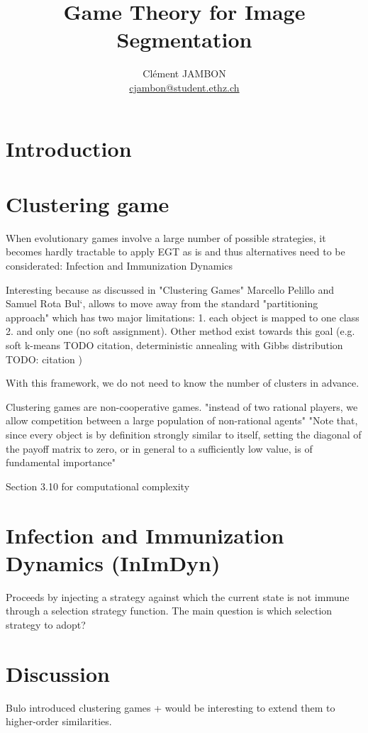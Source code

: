 \documentclass[11pt,a4paper]{article}
\begin{document}
\title{Game Theory for Image Segmentation}
\author{Clément JAMBON \\ \href{mailto:cjambon@student.ethz.ch}{cjambon@student.ethz.ch}}
\maketitle

\begin{abstract}
    
\end{abstract}

\section{Introduction}

\section{Clustering game}

When evolutionary games involve a large number of possible strategies, it becomes hardly tractable to apply EGT as is and thus alternatives need to be considerated: Infection and Immunization Dynamics    

Interesting because as discussed in "Clustering Games" Marcello Pelillo and Samuel Rota Bul`, allows to move away from the standard "partitioning approach" which has two major limitations: 1. each object is mapped to one class 2. and only one (no soft assignment). Other method exist towards this goal (e.g. soft k-means TODO citation, deterministic annealing with Gibbs distribution TODO: citation )

With this framework, we do not need to know the number of clusters in advance.

Clustering games are non-cooperative games. "instead of two rational players, we allow competition between a large population of non-rational agents" "Note that, since every object is by definition strongly similar to itself, setting the diagonal of the payoff matrix to zero, or in general to a sufficiently low value, is of fundamental importance"

Section 3.10 for computational complexity

\section{Infection and Immunization Dynamics (InImDyn)}
Proceeds by injecting a strategy against which the current state is not immune through a selection strategy function. The main question is which selection strategy to adopt?

\section{Discussion}

Bulo introduced clustering games + would be interesting to extend them to higher-order similarities.
\end{document}
